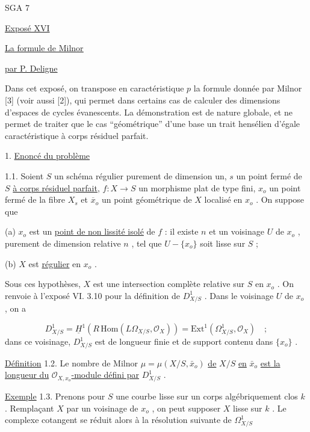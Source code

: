 


SGA 7


\underline{Exposé XVI}


\underline{\underline{La formule de Milnor}}


\underline{par P. Deligne}

Dans cet exposé, on transpose en caractéristique $p$ la formule donnée par Milnor [3] (voir aussi [2]), qui permet dans certains cas de calculer des dimensions d'espaces de cycles évanescents. La démonstration est de nature globale, et ne permet de traiter que le cas ``géométrique'' d'une base un trait hensélien d'égale caractéristique à corps résiduel parfait.


1. \underline{Enoncé du problème}

1.1. Soient $S$ un schéma régulier purement de dimension un, $s$ un point fermé de $S$ \underline{à corps résiduel parfait}, $f : X \to S$ un morphisme plat de type fini, $x_o$ un point fermé de la fibre $X_s$ et $\overline{x}_o$ un point géométrique de $X$ localisé en $x_o$ . On suppose que

(a) $x_o$ est un \underline{point de non lissité isolé} de $f$ : il existe $n$ et un voisinage $U$ de $x_o$ , purement de dimension relative $n$ , tel que $U - \{x_o\}$ soit lisse sur $S$ ;

(b) $X$ est \underline{régulier} en $x_o$ .

Sous ces hypothèses, $X$ est une intersection complète relative sur $S$ en $x_o$ . On renvoie à l'exposé VI. 3.10 pour la définition de $D^1_{X/S}$ . Dans le voisinage $U$ de $x_o$ , on a

\begin{equation*}
D^1_{X/S} = \underline{H}^1(R\,\mathrm{Hom}(L\Omega_{X/S},\mathcal{O}_X)) = \mathrm{Ext}^1(\Omega^1_{X/S},\mathcal{O}_X) \quad ;
\end{equation*}
dans ce voisinage, $D^1_{X/S}$ est de longueur finie et de support contenu dans $\{x_o\}$ .



\underline{Définition} 1.2. Le nombre de Milnor $\mu = \mu(X/S,\bar{x}_o)$ \underline{de} $X/S$ \underline{en} $\bar{x}_o$ \underline{est la longueur du} $\mathcal{O}_{X,x_o}$\underline{-module défini par} $D^1_{X/S}$ .

\underline{Exemple} 1.3. Prenons pour $S$ une courbe lisse sur un corps algébriquement clos $k$ . Remplaçant $X$ par un voisinage de $x_o$ , on peut supposer $X$ lisse sur $k$ . Le complexe cotangent se réduit alors à la résolution suivante de $\Omega^1_{X/S}$

